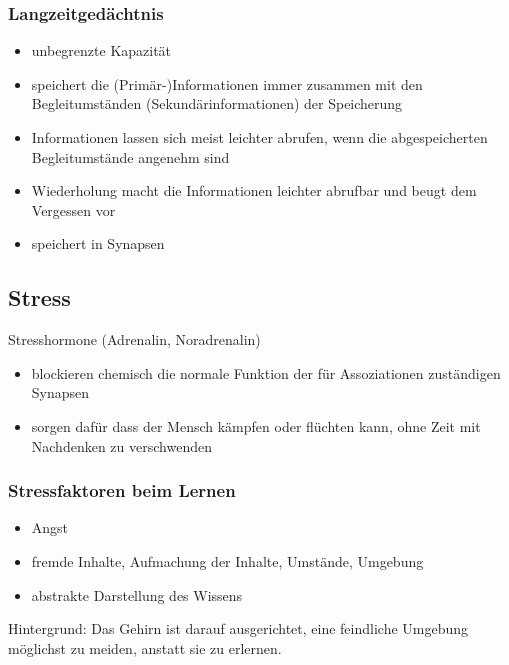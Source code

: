 \subsubsection{Langzeitgedächtnis}
\begin{itemize}
  \item unbegrenzte Kapazität
  \item speichert die (Primär-)Informationen immer zusammen mit den Begleitumständen (Sekundärinformationen) der Speicherung
  \item Informationen lassen sich meist leichter abrufen, wenn die abgespeicherten Begleitumstände angenehm sind
  \item Wiederholung macht die Informationen leichter abrufbar und beugt dem Vergessen vor
  \item speichert in Synapsen
\end{itemize}

\subsection{Stress}
Stresshormone (Adrenalin, Noradrenalin)
\begin{itemize}
  \item blockieren chemisch die normale Funktion der für Assoziationen zuständigen Synapsen
  \item sorgen dafür dass der Mensch kämpfen oder flüchten kann, ohne Zeit mit Nachdenken zu verschwenden
\end{itemize}

\subsubsection{Stressfaktoren beim Lernen}
\begin{itemize}
  \item Angst
  \item fremde Inhalte, Aufmachung der Inhalte, Umstände, Umgebung
  \item abstrakte Darstellung des Wissens
\end{itemize}

Hintergrund: Das Gehirn ist darauf ausgerichtet, eine feindliche Umgebung möglichst zu meiden, anstatt sie zu erlernen.

